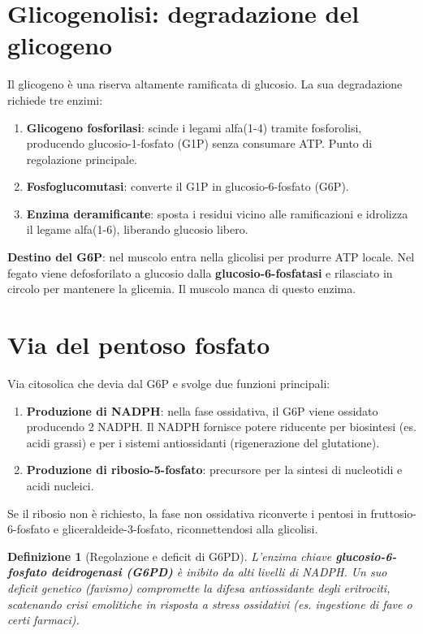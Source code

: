 \documentclass[12pt,a4paper]{report}
\newtheorem{definizione}{Definizione}[section]
\begin{document}
\section{Glicogenolisi: degradazione del glicogeno}
Il glicogeno è una riserva altamente ramificata di glucosio. La sua degradazione richiede tre enzimi:
\begin{enumerate}
\item \textbf{Glicogeno fosforilasi}: scinde i legami alfa(1-4) tramite fosforolisi, producendo glucosio-1-fosfato (G1P) senza consumare ATP. Punto di regolazione principale.
\item \textbf{Fosfoglucomutasi}: converte il G1P in glucosio-6-fosfato (G6P).
\item \textbf{Enzima deramificante}: sposta i residui vicino alle ramificazioni e idrolizza il legame alfa(1-6), liberando glucosio libero.
\end{enumerate}
\textbf{Destino del G6P}: nel muscolo entra nella glicolisi per produrre ATP locale. Nel fegato viene defosforilato a glucosio dalla \textbf{glucosio-6-fosfatasi} e rilasciato in circolo per mantenere la glicemia. Il muscolo manca di questo enzima.

\section{Via del pentoso fosfato}
Via citosolica che devia dal G6P e svolge due funzioni principali:
\begin{enumerate}
\item \textbf{Produzione di NADPH}: nella fase ossidativa, il G6P viene ossidato producendo 2 NADPH. Il NADPH fornisce potere riducente per biosintesi (es. acidi grassi) e per i sistemi antiossidanti (rigenerazione del glutatione).
\item \textbf{Produzione di ribosio-5-fosfato}: precursore per la sintesi di nucleotidi e acidi nucleici.
\end{enumerate}
Se il ribosio non è richiesto, la fase non ossidativa riconverte i pentosi in fruttosio-6-fosfato e gliceraldeide-3-fosfato, riconnettendosi alla glicolisi.
\begin{definizione}[Regolazione e deficit di G6PD]
L'enzima chiave \textbf{glucosio-6-fosfato deidrogenasi (G6PD)} è inibito da alti livelli di NADPH. Un suo deficit genetico (favismo) compromette la difesa antiossidante degli eritrociti, scatenando crisi emolitiche in risposta a stress ossidativi (es. ingestione di fave o certi farmaci).
\end{definizione}
\end{document}
